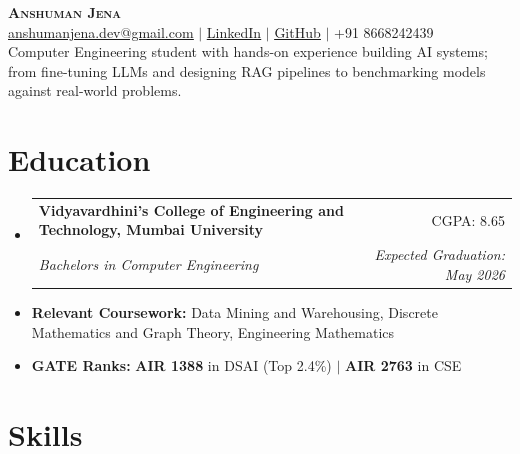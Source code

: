 \documentclass[letterpaper,10pt]{article}
\makeatletter
\newcommand{\resumeSubheading}[4]{
  \vspace{-2pt}\item
    \begin{tabular*}{\textwidth}[t]{@{}p{0.75\textwidth}@{\extracolsep{\fill}}r@{}}
      \textbf{#1} & \small #2 \\
      \textit{\small#3} & \textit{\small #4} \\
    \end{tabular*}\vspace{-4pt}
}
\newcommand{\resumeSubHeadingListStart}{\begin{itemize}[leftmargin=0in, label={}, topsep=0pt, partopsep=0pt]}
\newcommand{\resumeSubHeadingListEnd}{\end{itemize}}
\makeatother
\begin{document}
\fontsize{10.5}{11}\selectfont
\begin{center}
    {\Huge \scshape \textbf{Anshuman Jena}} \\ \vspace{4pt}
    \href{mailto:anshumanjena.dev@gmail.com}{\ul{anshumanjena.dev@gmail.com}} $|$
    \href{https://www.linkedin.com/in/anshumanjena/}{\ul{LinkedIn}} $|$
    \href{https://github.com/abandonedmonk}{\ul{GitHub}} $|$
    +91 8668242439 \\ \vspace{6pt}
    {Computer Engineering student with hands-on experience building AI systems; from fine-tuning LLMs and designing RAG pipelines to benchmarking models against real-world problems.}
\end{center}
\section{Education}
\resumeSubHeadingListStart
  \resumeSubheading
    {Vidyavardhini's College of Engineering and Technology, Mumbai \mbox{University}}{CGPA: 8.65}
    {Bachelors in Computer Engineering}{\textit{Expected Graduation: May 2026}}  \vspace{-9pt}
  \item \small{\textbf{Relevant Coursework:} Data Mining and Warehousing, Discrete Mathematics and Graph Theory, Engineering Mathematics} \vspace{-6pt}
  \item \small{\textbf{GATE Ranks:} \textbf{AIR 1388} in DSAI (Top 2.4\%) $|$ \textbf{AIR 2763} in CSE}
\resumeSubHeadingListEnd
\section{Skills}
\begin{itemize}[leftmargin=0in, label={}, topsep=0pt, partopsep=0pt]
  \small{\item{
  }}
\end{itemize}
\end{document}
